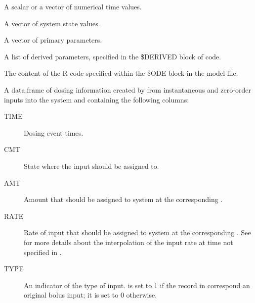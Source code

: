 \begin{Arguments}
\begin{ldescription}
\item[\code{t}] A scalar or a vector of numerical time values.
\item[\code{y}] A vector of system state values.
\item[\code{parms}] A vector of primary parameters.
\item[\code{derparms}] A list of derived parameters, specified in the \$DERIVED block
of code.
\item[\code{codeode}] The content of the R code specified within the \$ODE block 
in the model file.
\item[\code{dosing}] A data.frame of dosing information created by 
from instantaneous and zero-order inputs into the system and containing the 
following columns: \begin{description}

\item[TIME] Dosing event times.
\item[CMT] State where the input should be assigned to.
\item[AMT] Amount that should be assigned to system  at the
corresponding .
\item[RATE] Rate of input that should be assigned to system  at 
the corresponding . See 
 for more details about
the interpolation of the input rate at time not specified in
.
\item[TYPE] An indicator of the type of input.  is set to 1 if
the record in  correspond an original bolus input; it is 
set to 0 otherwise.

\end{description}



\end{ldescription}
\end{Arguments}
